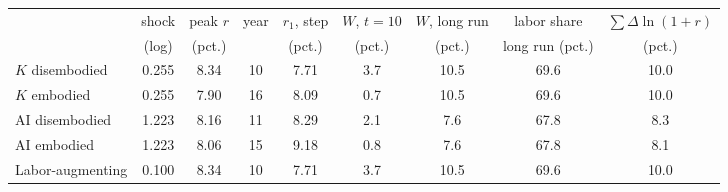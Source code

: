 \begin{tabular}{lcccccccc}\toprule
 & shock & peak $r$ & year & $r_1$, step & $W$, $t{=}10$ & $W$, long run & labor share & $\sum\Delta\ln(1+r)$\\
 & (log) & (pct.) & & (pct.) & (pct.) & (pct.) & long run (pct.) & (pct.)\\\midrule
$K$ disembodied & 0.255 & 8.34 & 10 & 7.71 & 3.7 & 10.5 & 69.6 & 10.0\\
$K$ embodied & 0.255 & 7.90 & 16 & 8.09 & 0.7 & 10.5 & 69.6 & 10.0\\
AI disembodied & 1.223 & 8.16 & 11 & 8.29 & 2.1 & 7.6 & 67.8 & 8.3\\
AI embodied & 1.223 & 8.06 & 15 & 9.18 & 0.8 & 7.6 & 67.8 & 8.1\\
Labor-augmenting & 0.100 & 8.34 & 10 & 7.71 & 3.7 & 10.5 & 69.6 & 10.0\\
\bottomrule\end{tabular}
